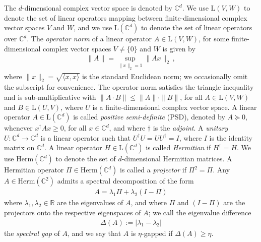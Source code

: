 \documentclass[a4paper,onecolumn,11pt]{quantumarticle}
\theoremstyle{plain}
\begin{document}
The $d$-dimensional complex vector space is denoted by $\mathbb{C}^d$. We use $\mathrm{L}(V,W)$ to denote the set of linear operators mapping between finite-dimensional complex vector spaces $V$ and $W$, and we use
$\mathrm{L}(\mathbb{C}^d)$ to denote the set of linear operators over $\mathbb{C}^d$. The \emph{operator norm} of a linear operator $A \in \mathrm{L}(V,W)$, for some finite-dimensional complex vector spaces $V \neq \{0\}$ and $W$ is given by
\begin{align}
\|A \| = \sup_{\|x\|_2 =1} \|A x\|_2 \, ,    
\end{align}
where $\|x \|_2 = \sqrt{\langle x,x \rangle}$ is the standard Euclidean norm; we occasionally omit the subscript for convenience. The operator norm satisfies the triangle inequality and is sub-multiplicative with $\|A \cdot B\| \leq \|A\| \cdot \|B\|$, for all $A \in \mathrm{L}(V,W)$ and $B \in \mathrm{L}(U,V)$, where $U$ is a finite-dimensional complex vector space.
A linear operator $A \in \mathrm{L}(\mathbb{C}^d)$ is called \emph{positive semi-definite} (PSD), denoted by $A \succeq 0$, whenever $x^\dag A x \geq 0$, for all $x \in \mathbb{C}^d$, and where $\dag$ is the \emph{adjoint}.
A \emph{unitary} $U: \mathbb{C}^d \to \mathbb{C}^d$ is a linear operator such that $U^\dagger U = U U^\dagger = I$, where $I$ is the identity matrix on $\mathbb{C}^d$. 
A linear operator $H \in \mathrm{L}(\mathbb{C}^d)$ is called \emph{Hermitian} if $H^\dag = H$. We use $\mathrm{Herm}(\mathbb{C}^{d})$ to denote the set of $d$-dimensional Hermitian matrices. 
A Hermitian operator $\Pi \in \mathrm{Herm}(\mathbb{C}^{d})$ is called a \emph{projector} if $\Pi^2=\Pi$. Any $A \in \mathrm{Herm}(\mathbb{C}^{2})$ admits a spectral decomposition of the form 
\begin{align}
 A = \lambda_1 \Pi + \lambda_2 (I -\Pi)   
\end{align}
where $\lambda_1,\lambda_2 \in \mathbb{R}$ are the eigenvalues of $A$, and where $\Pi$ and $(I-\Pi)$ are the projectors onto the respective eigenspaces of $A$; we call the eigenvalue difference
\begin{align}
\Delta(A) := |\lambda_1 - \lambda_2|   
\end{align}
the \emph{spectral gap} of $A$, and we say that $A$ is
$\eta$-gapped if $\Delta(A) \geq \eta$.
\end{document}
